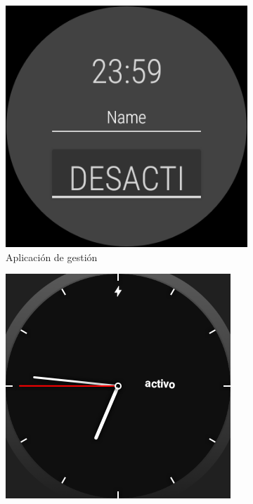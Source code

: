 \documentclass[11pt,a4paper,spanish,twocolumn]{article}
\begin{document}
\begin{figure}[!ht]
  \centering
  \begin{subfigure}[b]{0.48\columnwidth}
      \centering
      \includegraphics[width=\linewidth]{img/appActivity.png}
      \caption{\footnotesize Aplicación de gestión}
      \label{fig:uiActivity}
  \end{subfigure}
  \hfill
  \begin{subfigure}[b]{0.48\columnwidth}
      \centering
      \includegraphics[width=\linewidth]{img/appWatchface.png}

\end{subfigure}
\end{figure}
\end{document}
